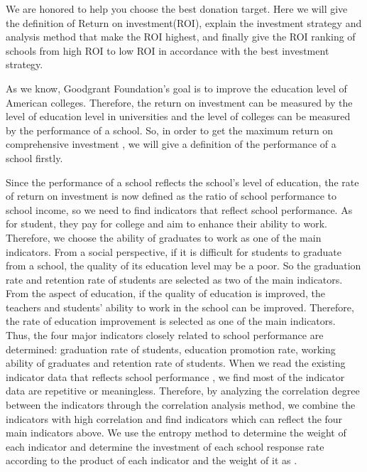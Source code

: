 \documentclass{mcmthesis}
\begin{document}
\par We are honored to help you choose the best donation target. Here we will give the definition of Return on investment(ROI), explain the investment strategy and analysis method that make the ROI highest, and finally give the ROI ranking of schools from high ROI to low ROI in accordance with the best investment strategy.
\par As we know, Goodgrant Foundation's goal is to improve the education level of American colleges. Therefore, the return on investment can be measured by the level of education level in universities and the level of colleges can be measured by the performance of a school. So, in order to get the maximum return on comprehensive investment ,  we will give a definition of the performance of a school firstly.
\par Since the performance of a school reflects the school's level of education, the rate of return on investment is now defined as the ratio of school performance to school income, so we need to find indicators that reflect school performance. As for student, they pay for college and aim to enhance their ability to work. Therefore, we choose the ability of graduates to work as one of the main indicators. From a social perspective, if it is difficult for students to graduate from a school, the quality of its education level may be a poor. So the graduation rate and retention rate of students are selected as two of the main indicators. From the aspect of education, if the quality of education is improved, the teachers and students' ability to work in the school can be improved. Therefore, the rate of education improvement is selected as one of the main indicators. Thus, the four major indicators closely related to school performance are determined: graduation rate of students, education promotion rate, working ability of graduates and retention rate of students. When we read the existing indicator data that reflects school performance , we find  most of the indicator data are repetitive or meaningless. Therefore, by analyzing the correlation degree between the indicators through the correlation analysis method, we combine the indicators with high correlation and find indicators which can reflect the four main indicators above. We use the entropy method to determine the weight of each indicator and determine the investment of each school response rate according to the product of each indicator and the weight of it as .
\end{document}
